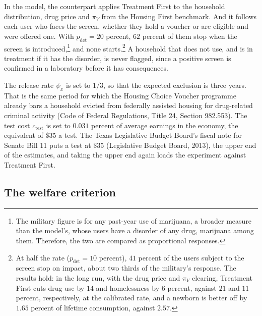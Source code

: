 \documentclass[10pt]{article}
\begin{document}
  In the model, the counterpart applies Treatment First to the household distribution, drug price and $\pi_V$ from the Housing First benchmark. And it follows each user who faces the screen, whether they hold a voucher or are eligible and were offered one. With $p_{\mathrm{det}}=20$ percent, $62$ percent of them stop when the screen is introduced,\footnote{The military figure is for any past-year use of marijuana, a broader measure than the model's, whose users have a disorder of any drug, marijuana among them. Therefore, the two are compared as proportional responses.} and none starts.\footnote{\label{fn:halfrate}At half the rate ($p_{\mathrm{det}}=10$ percent), $41$ percent of the users subject to the screen stop on impact, about two thirds of the military's response. The results hold: in the long run, with the drug price and $\pi_V$ clearing, Treatment First cuts drug use by $14$ and homelessness by $6$ percent, against $21$ and $11$ percent, respectively, at the calibrated rate, and a newborn is better off by $1.65$ percent of lifetime consumption, against $2.57$.} A household that does not use, and is in treatment if it has the disorder, is never flagged, since a positive screen is confirmed in a laboratory before it has consequences.

The release rate $\psi_x$ is set to $1/3$, so that the expected
exclusion is three years. That is the same period for which the Housing Choice Voucher programme
already bars a household evicted from federally assisted housing for drug-related criminal
activity (Code of Federal Regulations, Title 24, Section 982.553). The test cost $c_{\mathrm{test}}$ is set to $0.031$ percent of average earnings in the economy, the equivalent of
\$35 a test. The Texas Legislative Budget Board's fiscal note for Senate Bill 11 puts a test at \$35 (Legislative Budget Board, 2013), the upper end of the estimates, and taking the upper end again loads the experiment against Treatment First.

\subsection{The welfare criterion}\label{sec:cev}
\end{document}
